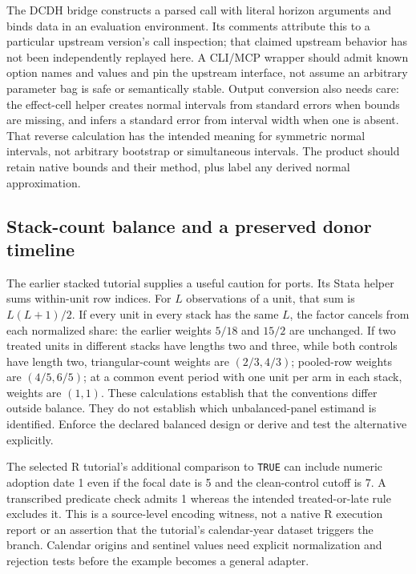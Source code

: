 The DCDH bridge constructs a parsed call with literal horizon arguments and binds data in an evaluation environment. Its
comments attribute this to a particular upstream version's call inspection; that claimed upstream behavior has not been
independently replayed here. A CLI/MCP wrapper should admit known option names and values and pin the upstream interface,
not assume an arbitrary parameter bag is safe or semantically stable. Output conversion also needs care: the effect-cell
helper creates normal intervals from standard errors when bounds are missing, and infers a standard error from interval
width when one is absent. That reverse calculation has the intended meaning for symmetric normal intervals, not arbitrary
bootstrap or simultaneous intervals. The product should retain native bounds and their method, plus label any derived
normal approximation.\citep{exec28_panel_delegates}

\subsection{Stack-count balance and a preserved donor timeline}

The earlier stacked tutorial supplies a useful caution for ports. Its Stata helper sums within-unit row indices. For
$L$ observations of a unit, that sum is $L(L+1)/2$. If every unit in every stack has the same $L$, the factor cancels
from each normalized share: the earlier weights $5/18$ and $15/2$ are unchanged. If two treated units in different stacks
have lengths two and three, while both controls have length two, triangular-count weights are $(2/3,4/3)$; pooled-row
weights are $(4/5,6/5)$; at a common event period with one unit per arm in each stack, weights are $(1,1)$.
These calculations establish that the conventions differ outside balance. They do not establish which unbalanced-panel
estimand is identified. Enforce the declared balanced design or derive and test the alternative explicitly.
\citep{exec28_panel_delegate_reference}

The selected R tutorial's additional comparison to \texttt{TRUE} can include numeric adoption date 1 even if the focal
date is 5 and the clean-control cutoff is 7. A transcribed predicate check admits 1 whereas the intended treated-or-late
rule excludes it. This is a source-level encoding witness, not a native R execution report or an assertion that the
tutorial's calendar-year dataset triggers the branch. Calendar origins and sentinel values need explicit normalization
and rejection tests before the example becomes a general adapter.\citep{exec28_panel_delegate_reference}

